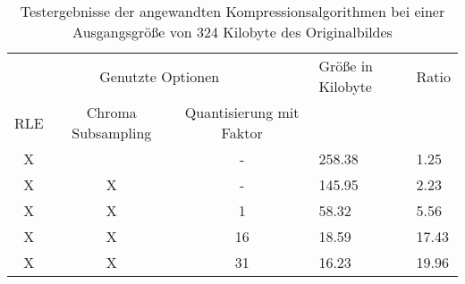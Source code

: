 \begin{table}
\centering
\begin{tabular}{|ccc|l|l|}
	\hline
	\multicolumn{3}{|c|}{Genutzte Optionen}             & Größe in Kilobyte & Ratio \\
	RLE & Chroma Subsampling & Quantisierung mit Faktor &                   &       \\
	\hline
	X   &                    & -                        & 258.38            & 1.25 \\
	X   & X                  & -                        & 145.95            & 2.23 \\
	X   & X                  & 1                        & 58.32             & 5.56 \\
	X   & X                  & 16                       & 18.59             & 17.43 \\
	X   & X                  & 31                       & 16.23             & 19.96 \\
	\hline
\end{tabular}
\caption{Testergebnisse der angewandten Kompressionsalgorithmen bei einer Ausgangsgröße von 324 Kilobyte des Originalbildes}
\label{tab:test}
\end{table}
